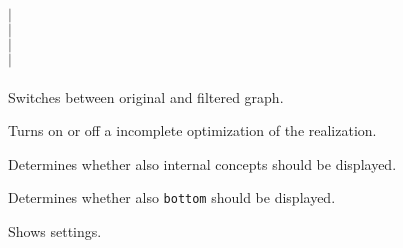    $|$\\
   $|$\\
   $|$\\
   $|$\\
  \\

Switches between original and filtered graph.

Turns on or off a incomplete optimization of the realization.

Determines whether also internal concepts should be displayed.

Determines whether also {\tt bottom} should be displayed.

Shows settings.



